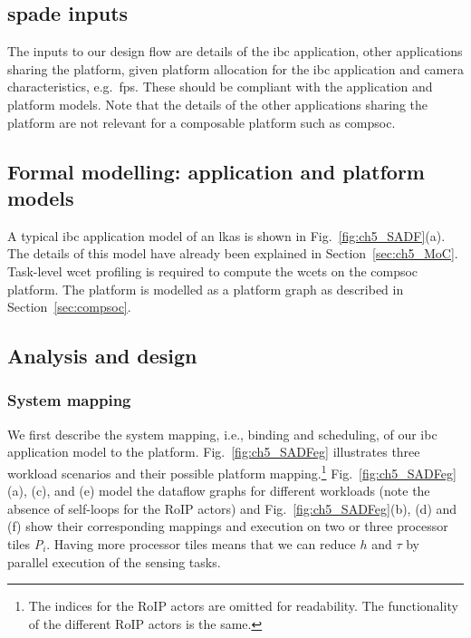 \subsection{\gls{spade} inputs}
The inputs to our design flow are details of the \gls{ibc} application, other applications sharing the platform, given platform allocation for the \gls{ibc} application and camera characteristics, e.g.\ \gls{fps}. These should be compliant with the application and platform models. Note that the details of the other applications sharing the platform are not relevant for a composable platform such as \gls{compsoc}. 

\subsection{Formal modelling: application and platform models}
A typical \gls{ibc} application model of an \gls{lkas} is shown in Fig.~\ref{fig:ch5_SADF}(a).
The details of this model have already been explained in Section~\ref{sec:ch5_MoC}.
Task-level \gls{wcet} profiling is required to compute the \glspl{wcet} on the \gls{compsoc} platform.
The platform is modelled as a platform graph as described in Section~\ref{sec:compsoc}. 

\subsection{Analysis and design}
\subsubsection{System mapping} 
We first describe the system mapping, i.e., binding and scheduling, of our \gls{ibc} application model to the platform.
Fig.~\ref{fig:ch5_SADFeg} illustrates three workload scenarios and their possible platform mapping.\footnote{The indices for the RoIP actors are omitted for readability. The functionality of the different RoIP actors is the same.} Fig.~\ref{fig:ch5_SADFeg}(a), (c), and (e) model the dataflow graphs for different workloads (note the absence of self-loops for the RoIP actors) and Fig.~\ref{fig:ch5_SADFeg}(b), (d) and (f) show their corresponding mappings and execution on two or three processor tiles \emph{P}$_i$. Having more processor tiles means that we can reduce $h$ and $\tau$ by parallel execution of the sensing tasks.

